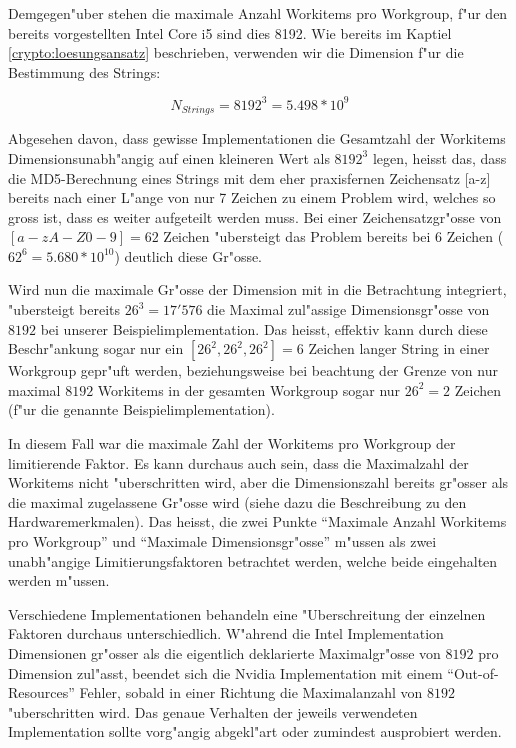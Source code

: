 \begin{refsection}
Demgegen"uber stehen die maximale Anzahl Workitems pro Workgroup, f"ur
den bereits vorgestellten Intel Core i5 sind dies 8192. Wie bereits im
Kaptiel \ref{crypto:loesungsansatz} beschrieben, verwenden wir die 
Dimension f"ur die Bestimmung des Strings:

\[
  N_{Strings} = 8192^3 = 5.498*10^{9}
\]

Abgesehen davon, dass gewisse Implementationen die Gesamtzahl der 
Workitems Dimensionsunabh"angig auf einen kleineren Wert als  $8192^3$
legen, heisst das, dass die MD5-Berechnung eines Strings mit dem eher 
praxisfernen Zeichensatz [a-z] bereits nach einer L"ange von nur
7 Zeichen zu einem Problem wird, welches so gross ist, dass es weiter
aufgeteilt werden muss. Bei einer Zeichensatzgr"osse
von $[a-zA-Z0-9] = 62$ Zeichen "ubersteigt das Problem bereits bei 6
Zeichen ($62^6 = 5.680 * 10^{10}$) deutlich diese Gr"osse.

Wird nun die maximale Gr"osse der Dimension mit in die Betrachtung
integriert, "ubersteigt bereits $26^3 = 17'576$ die Maximal zul"assige
Dimensionsgr"osse von $8192$ bei unserer Beispielimplementation. Das heisst,
effektiv kann durch diese Beschr"ankung sogar nur ein $[26^2, 26^2, 26^2] = 6$ 
Zeichen langer String in einer Workgroup gepr"uft werden, beziehungsweise bei 
beachtung der Grenze von nur maximal $8192$ Workitems in der gesamten Workgroup 
sogar nur $26^2 = 2$ Zeichen (f"ur die genannte Beispielimplementation).

In diesem Fall war die maximale Zahl der Workitems pro Workgroup der limitierende 
Faktor. Es kann durchaus auch sein, dass die Maximalzahl der Workitems nicht 
"uberschritten wird, aber die Dimensionszahl bereits gr"osser als die maximal
zugelassene Gr"osse wird (siehe dazu die Beschreibung zu den Hardwaremerkmalen).
Das heisst, die zwei Punkte ``Maximale Anzahl Workitems pro Workgroup'' und 
``Maximale Dimensionsgr"osse'' m"ussen als zwei unabh"angige Limitierungsfaktoren
betrachtet werden, welche beide eingehalten werden m"ussen.

Verschiedene Implementationen behandeln eine "Uberschreitung der einzelnen
Faktoren durchaus unterschiedlich. W"ahrend
die Intel Implementation Dimensionen gr"osser als die eigentlich deklarierte
Maximalgr"osse von $8192$ pro Dimension zul"asst, beendet sich die Nvidia 
Implementation mit einem ``Out-of-Resources'' Fehler, sobald in einer Richtung 
die Maximalanzahl von $8192$ "uberschritten wird. Das genaue Verhalten der
jeweils verwendeten Implementation sollte vorg"angig abgekl"art oder
zumindest ausprobiert werden. 



\end{refsection}
